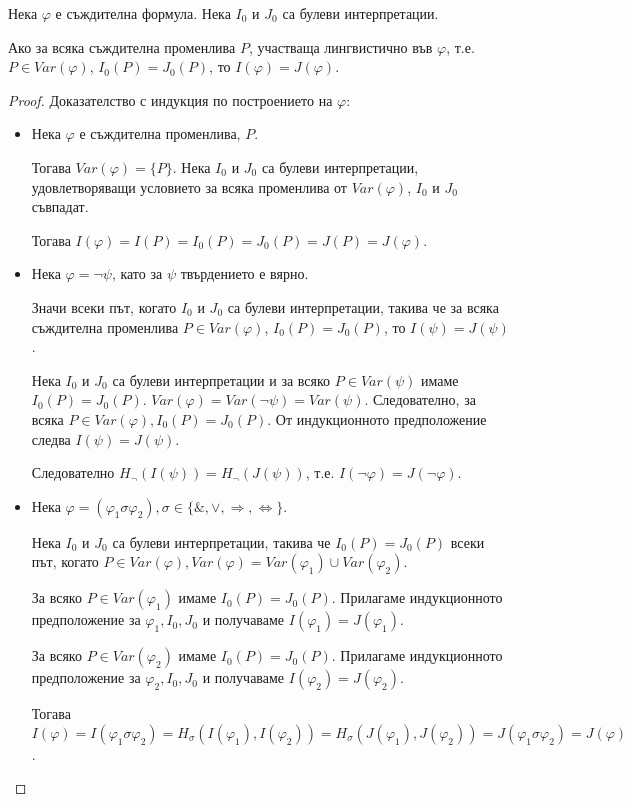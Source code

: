 \documentclass{article}
\def\Proofs{1}
\begin{document}
\begin{claim}
Нека $\varphi$ е съждителна формула. Нека $I_0$ и $J_0$ са булеви интерпретации. 

Ако за всяка съждителна променлива $P$, участваща лингвистично във $\varphi$, т.е. $P \in Var(\varphi)$, $I_0(P) = J_0(P)$, то $I(\varphi) = J(\varphi)$.

\ifcase\Proofs\or
\begin{proof}
Доказателство с индукция по построението на $\varphi$:
\begin{itemize}
\item Нека $\varphi$ е съждителна променлива, $P$.

Тогава $Var(\varphi) = \{P\}$. Нека $I_0$ и $J_0$ са булеви интерпретации, удовлетворяващи условието за всяка променлива от $Var(\varphi)$, $I_0$ и $J_0$ съвпадат.

Тогава $I(\varphi) = I(P) = I_0(P) = J_0(P) = J(P) = J(\varphi)$.

\item Нека $\varphi = \neg\psi$, като за $\psi$ твърдението е вярно. 

Значи всеки път, когато $I_0$ и $J_0$ са булеви интерпретации, такива че за всяка съждителна променлива $P \in Var(\varphi)$, $I_0(P) = J_0(P)$, то $I(\psi) = J(\psi)$.

Нека $I_0$ и $J_0$ са булеви интерпретации и за всяко $P \in Var(\psi)$ имаме $I_0(P) = J_0(P)$. $Var(\varphi) = Var(\neg\psi) = Var(\psi)$. Следователно, за всяка $P \in Var(\varphi), I_0(P) = J_0(P)$. От индукционното предположение следва $I(\psi) = J(\psi)$.

Следователно $H_\neg(I(\psi)) = H_\neg(J(\psi))$, т.е. $I(\neg\varphi) = J(\neg\varphi)$.

\item Нека $\varphi = (\varphi_1 \sigma \varphi_2), \sigma \in \{\&, \lor, \Rightarrow, \Leftrightarrow\}$.

Нека $I_0$ и $J_0$ са булеви интерпретации, такива че $I_0(P) = J_0(P)$ всеки път, когато $P \in Var(\varphi), Var(\varphi) = Var(\varphi_1) \cup Var(\varphi_2)$.

За всяко $P \in Var(\varphi_1)$ имаме $I_0(P) = J_0(P)$. Прилагаме индукционното предположение за $\varphi_1, I_0, J_0$ и получаваме $I(\varphi_1) = J(\varphi_1)$.

За всяко $P \in Var(\varphi_2)$ имаме $I_0(P) = J_0(P)$. Прилагаме индукционното предположение за $\varphi_2, I_0, J_0$ и получаваме $I(\varphi_2) = J(\varphi_2)$.

Тогава $I(\varphi) = I(\varphi_1 \sigma \varphi_2) = H_\sigma(I(\varphi_1), I(\varphi_2)) = H_\sigma(J(\varphi_1), J(\varphi_2)) = J(\varphi_1 \sigma \varphi_2) = J(\varphi)$.
\end{itemize}
\end{proof}
\fi


\end{claim}
\end{document}
